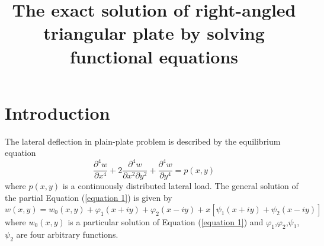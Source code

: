 \documentclass[a4paper]{article}      %
\title{The exact solution of right-angled triangular plate by solving functional equations}%
\begin{document}
\maketitle
\graphicspath{{figures/}}
\section{Introduction}
The lateral deflection in plain-plate problem is described by the equilibrium equation
    \begin{equation}\label{equation 1}                                       %
    \frac{\partial^{4}w}{\partial x^{4}}+ 2\frac{\partial^{4}w}{\partial x^{2} \partial y^{2}}+\frac{\partial^{4}w}{\partial y^{4}}=p(x,y)
    \end{equation}
where $ p(x,y)$ is a continuously distributed lateral load.
The general solution of the partial Equation (\ref{equation 1}) is given by
    \begin{equation}\label{equation 2}                                       %
    w(x,y)=w_{0}(x,y)+\varphi_{1}(x+iy)+\varphi_{2}(x-iy)+x[\psi_{1}(x+iy)+\psi_{2}(x-iy)]
    \end{equation}
where $w_{0}(x,y)$ is a particular solution of Equation (\ref{equation 1}) and $\varphi_{1}$,$\varphi_{2}$,$\psi_{1}$,$\psi_{2}$ are four arbitrary functions.
\end{document}
